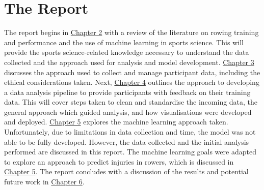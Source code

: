 \section{The Report}
The report begins in \hyperref[ch:background]{Chapter 2} with a review of the literature on rowing training and performance and the use of machine learning in sports science. This will provide the sports science-related knowledge necessary to understand the data collected and the approach used for analysis and model development. \hyperref[ch:data-collect-mng]{Chapter 3} discusses the approach used to collect and manage participant data, including the ethical considerations taken. Next, \hyperref[ch:data-anyl-viz]{Chapter 4} outlines the approach to developing a data analysis pipeline to provide participants with feedback on their training data. This will cover steps taken to clean and standardise the incoming data, the general approach which guided analysis, and how visualisations were developed and deployed. \hyperref[ch:ml]{Chapter 5} explores the machine learning approach taken. Unfortunately, due to limitations in data collection and time, the model was not able to be fully developed. However, the data collected and the initial analysis performed are discussed in this report. The machine learning goals were adapted to explore an approach to predict injuries in rowers, which is discussed in \hyperref[ch:ml]{Chapter 5}. The report concludes with a discussion of the results and potential future work in \hyperref[ch:discussion]{Chapter 6}.
